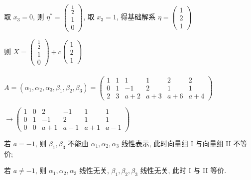          取 \( x_{3} = 0 \), 则 \( \eta^{*} = \begin{pmatrix}
             \frac{1}{2} \\
             1           \\
             0
         \end{pmatrix} \), 取 \( x_{3} = 1 \), 得基础解系 \( \eta=\begin{pmatrix}
             1 \\
             2 \\
             1
         \end{pmatrix} \)

         则 \( X = \begin{pmatrix}
             \frac{1}{2} \\
             1           \\
             0
         \end{pmatrix} + c\begin{pmatrix}
             1 \\
             2 \\
             1
         \end{pmatrix} \)


     \paragraph{} %
         \( A = (\alpha_{1}, \alpha_{2}, \alpha_{3}, \beta_{1}, \beta_{2}, \beta_{3}) = \begin{pmatrix}
             1 & 1 & 1   & 1   & 2   & 2   \\
             0 & 1 & -1  & 2   & 1   & 1   \\
             2 & 3 & a+2 & a+3 & a+6 & a+4
         \end{pmatrix} \)

         \( \rightarrow \begin{pmatrix}
             1 & 0 & 2   & -1  & 1   & 1   \\
             0 & 1 & -1  & 2   & 1   & 1   \\
             0 & 0 & a+1 & a-1 & a+1 & a-1
         \end{pmatrix} \)

         若 \( a = -1 \), 则 \( \beta_{1}, \beta_{3} \) 不能由 \( \alpha_{1}, \alpha_{2}, \alpha_{3} \) 线性表示, 此时向量组 I 与向量组 II 不等价;

         若 \( a \neq -1 \), 则 \( \alpha_{1}, \alpha_{2}, \alpha_{3} \) 线性无关, \( \beta_{1}, \beta_{2}, \beta_{3} \) 线性无关, 此时 I 与 II 等价.


